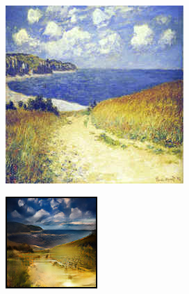 \documentclass{article}
\begin{document}
\begin{figure}[H]
    \centering
    \begin{subfigure}{.112\textwidth}
        \centering
        \includegraphics[width=\linewidth]{00010.jpg}
    \end{subfigure}%
    \begin{subfigure}{.112\textwidth}
        \centering
        \includegraphics[width=\linewidth]{0001.png}

\end{subfigure}
\end{figure}
\end{document}
